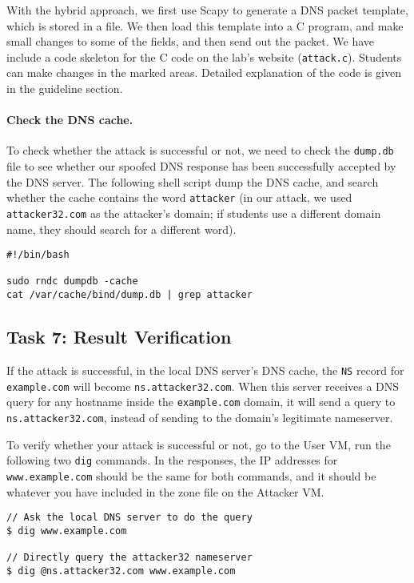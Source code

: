 With the hybrid approach, we first use Scapy to generate 
a DNS packet template, which is stored in a file. 
We then load this template into a C program, and make 
small changes to some of the fields, and then send 
out the packet. 
We have include a code skeleton for the C code
on the lab's website (\texttt{attack.c}). 
Students can make changes
in the marked areas. Detailed explanation
of the code is given in the 
guideline section.


\paragraph{Check the DNS cache.}
To check whether the attack is successful or not, we need to 
check the {\tt dump.db} file to see whether our spoofed DNS
response has been successfully accepted by the DNS server. 
The following shell script dump the DNS cache, and search whether
the cache contains the word \texttt{attacker} (in our 
attack, we used \texttt{attacker32.com} as the attacker's 
domain; if students use a different domain name, they should 
search for a different word).  

\begin{lstlisting}
#!/bin/bash

sudo rndc dumpdb -cache
cat /var/cache/bind/dump.db | grep attacker
\end{lstlisting}
 

\subsection{Task 7: Result Verification}

If the attack is successful, in the local DNS server's DNS cache, 
the {\tt NS} record for \texttt{example.com} will become 
\texttt{ns.attacker32.com}.
When this server receives a DNS query for any hostname
inside the \texttt{example.com} domain,  it will
send a query to \texttt{ns.attacker32.com}, instead of 
sending to the domain's legitimate nameserver. 


To verify whether your attack is successful or not, 
go to the User VM, run the following two
\texttt{dig} commands. In the responses, the IP addresses for 
\texttt{www.example.com} should be the same for both 
commands, and it should be whatever you have included
in the zone file on the Attacker VM. 

\begin{lstlisting}
// Ask the local DNS server to do the query
$ dig www.example.com

// Directly query the attacker32 nameserver
$ dig @ns.attacker32.com www.example.com
\end{lstlisting}
 
